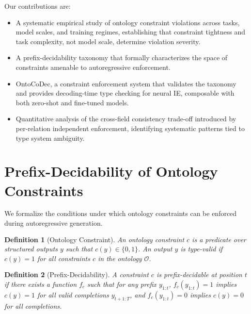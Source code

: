 \documentclass[11pt,a4paper]{article}
\newtheorem{definition}{Definition}
\begin{document}
Our contributions are:
\begin{itemize}[nosep]
    \item A systematic empirical study of ontology constraint violations across tasks, model scales, and training regimes, establishing that constraint tightness and task complexity, not model scale, determine violation severity.
    \item A prefix-decidability taxonomy that formally characterizes the space of constraints amenable to autoregressive enforcement.
    \item OntoCoDec, a constraint enforcement system that validates the taxonomy and provides decoding-time type checking for neural IE, composable with both zero-shot and fine-tuned models.
    \item Quantitative analysis of the cross-field consistency trade-off introduced by per-relation independent enforcement, identifying systematic patterns tied to type system ambiguity.
\end{itemize}

\section{Prefix-Decidability of Ontology Constraints}

We formalize the conditions under which ontology constraints can be enforced during autoregressive generation.

\begin{definition}[Ontology Constraint]
An ontology constraint $c$ is a predicate over structured outputs $y$ such that $c(y) \in \{0, 1\}$. An output $y$ is \emph{type-valid} if $c(y) = 1$ for all constraints $c$ in the ontology $\mathcal{O}$.
\end{definition}

\begin{definition}[Prefix-Decidability]
A constraint $c$ is \emph{prefix-decidable at position $t$} if there exists a function $f_c$ such that for any prefix $y_{1:t}$, $f_c(y_{1:t}) = 1$ implies $c(y) = 1$ for all valid completions $y_{t+1:T}$, and $f_c(y_{1:t}) = 0$ implies $c(y) = 0$ for all completions.
\end{definition}
\end{document}
